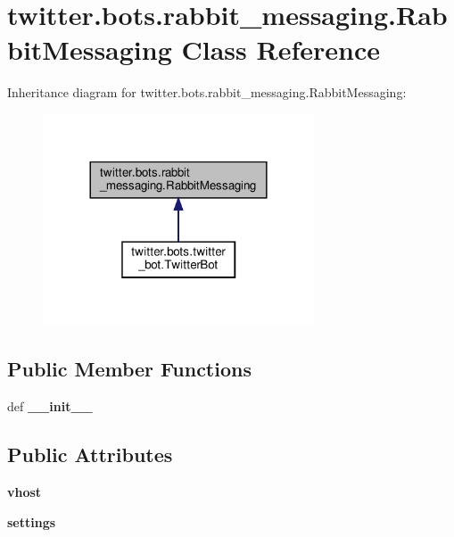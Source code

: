 \hypertarget{classtwitter_1_1bots_1_1rabbit__messaging_1_1RabbitMessaging}{}\section{twitter.\+bots.\+rabbit\+\_\+messaging.\+Rabbit\+Messaging Class Reference}
\label{classtwitter_1_1bots_1_1rabbit__messaging_1_1RabbitMessaging}


Inheritance diagram for twitter.\+bots.\+rabbit\+\_\+messaging.\+Rabbit\+Messaging\+:\nopagebreak
\begin{figure}[H]
\begin{center}
\leavevmode
\includegraphics[width=228pt]{d9/d46/classtwitter_1_1bots_1_1rabbit__messaging_1_1RabbitMessaging__inherit__graph}
\end{center}
\end{figure}
\subsection*{Public Member Functions}
\begin{DoxyCompactItemize}
\item 
\mbox{\label{classtwitter_1_1bots_1_1rabbit__messaging_1_1RabbitMessaging_a34c66d4ac88da28a2bd316ff79edf262}} 
def {\bfseries \+\_\+\+\_\+init\+\_\+\+\_\+}
\end{DoxyCompactItemize}
\subsection*{Public Attributes}
\begin{DoxyCompactItemize}
\item 
\mbox{\label{classtwitter_1_1bots_1_1rabbit__messaging_1_1RabbitMessaging_a191a98366932a439235d21008d942267}} 
{\bfseries vhost}
\item 
\mbox{\label{classtwitter_1_1bots_1_1rabbit__messaging_1_1RabbitMessaging_a6b30781862012f4ca02c57b581e4561f}} 
{\bfseries settings}
\end{DoxyCompactItemize}
